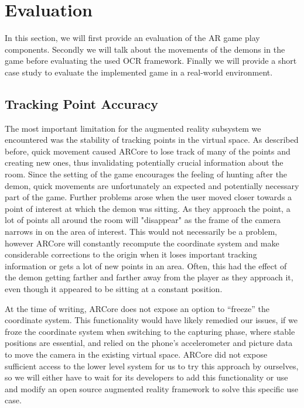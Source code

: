 \section{Evaluation}
\label{sec:evaluation}

In this section, we will first provide an evaluation of the AR game play components.
Secondly we will talk about the movements of the demons in the game before evaluating the used OCR framework.
Finally we will provide a short case study to evaluate the implemented game in a real-world environment.

\subsection{Tracking Point Accuracy}
The most important limitation for the augmented reality subsystem we encountered was the stability of tracking points in the virtual space.
As described before, quick movement caused ARCore to lose track of many of the points and creating new ones, thus invalidating potentially crucial information about the room.
Since the setting of the game encourages the feeling of hunting after the demon, quick movements are unfortunately an expected and potentially necessary part of the game.
Further problems arose when the user moved closer towards a point of interest at which the demon was sitting.
As they approach the point, a lot of points all around the room will "disappear" as the frame of the camera narrows in on the area of interest.
This would not necessarily be a problem, however ARCore will constantly recompute the coordinate system and make considerable corrections to the origin when it loses important tracking information or gets a lot of new points in an area.
Often, this had the effect of the demon getting farther and farther away from the player as they approach it, even though it appeared to be sitting at a constant position.

At the time of writing, ARCore does not expose an option to \enquote{freeze} the coordinate system.
This functionality would have likely remedied our issues, if we froze the coordinate system when switching to the capturing phase, where stable positions are essential, and relied on the phone's accelerometer and picture data to move the camera in the existing virtual space.
ARCore did not expose sufficient access to the lower level system for us to try this approach by ourselves, so we will either have to wait for its developers to add this functionality or use and modify an open source augmented reality framework to solve this specific use case.

